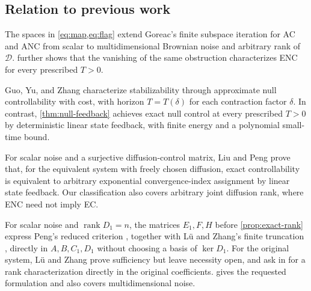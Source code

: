 \documentclass[twocolumn]{autart}
\begin{document}
\subsection{Relation to previous work}\label{intro:comparison}


The spaces in \cref{eq:map,eq:flag} extend Goreac's finite subspace iteration for AC and ANC \cite[Theorem~3 and Remark~4]{Goreac} from scalar to multidimensional Brownian noise and arbitrary rank of \(\mathcal D\).  further shows that the vanishing of the same obstruction characterizes ENC for every prescribed \(T>0\).

Guo, Yu, and Zhang \cite{GYZ} characterize stabilizability through approximate null controllability with cost, with horizon \(T=T(\delta)\) for each contraction factor \(\delta\). In contrast, \cref{thm:null-feedback} achieves exact null control at every prescribed \(T>0\) by deterministic linear state feedback, with finite energy and a polynomial small-time bound.

For scalar noise and a surjective diffusion-control matrix, Liu and Peng \cite{LiuPeng2002} prove that, for the equivalent system with freely chosen diffusion, exact controllability is equivalent to arbitrary exponential convergence-index assignment by linear state feedback. Our classification also covers arbitrary joint diffusion rank, where ENC need not imply EC.


For scalar noise and \(\operatorname{rank}D_1=n\), the matrices \(E_1,F,H\) before \cref{prop:exact-rank} express Peng's reduced criterion \cite[Theorem~3.2]{Peng1994}, together with L\"u and Zhang's finite truncation \cite[Theorem~6.10]{Lue2021a}, directly in \(A,B,C_1,D_1\) without choosing a basis of \(\ker D_1\). For the original system, L\"u and Zhang prove sufficiency but leave necessity open, and ask in \cite[Remark~6.11]{Lue2021a} for a rank characterization directly in the original coefficients.  gives the requested formulation and also covers multidimensional noise.
\end{document}
